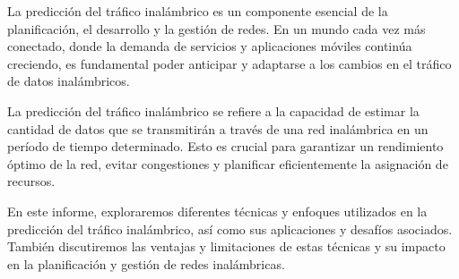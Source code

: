 La predicción del tráfico inalámbrico es un componente esencial de la planificación, el desarrollo y la gestión de redes. En un mundo cada vez más conectado, donde la demanda de servicios y aplicaciones móviles continúa creciendo, es fundamental poder anticipar y adaptarse a los cambios en el tráfico de datos inalámbricos.

La predicción del tráfico inalámbrico se refiere a la capacidad de estimar la cantidad de datos que se transmitirán a través de una red inalámbrica en un período de tiempo determinado. Esto es crucial para garantizar un rendimiento óptimo de la red, evitar congestiones y planificar eficientemente la asignación de recursos.

En este informe, exploraremos diferentes técnicas y enfoques utilizados en la predicción del tráfico inalámbrico, así como sus aplicaciones y desafíos asociados. También discutiremos las ventajas y limitaciones de estas técnicas y su impacto en la planificación y gestión de redes inalámbricas.
